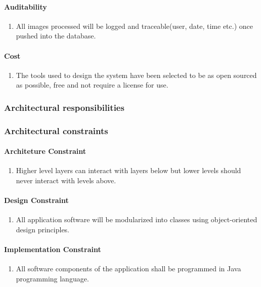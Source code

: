 \documentclass[a4paper,12pt]{report}
\begin{document}
\paragraph{Auditability}
\begin{enumerate}
	\item All images processed will be logged and traceable(user, date, time etc.) once pushed into the database.
\end{enumerate}
\paragraph{Cost}
\begin{enumerate}
	\item The tools used to design the system have been selected to be as open sourced as possible, free and not require a license for use.
\end{enumerate}

\subsubsection{Architectural responsibilities}


\subsubsection{Architectural constraints}
\paragraph{Architeture Constraint}
\begin{enumerate}
	\item Higher level layers can interact with layers below but lower levels should never interact with levels above.
\end{enumerate}
\paragraph{Design Constraint}
\begin{enumerate}
	\item All application software will be modularized into classes using object-oriented design principles.
\end{enumerate}
\paragraph{Implementation Constraint}
\begin{enumerate}
	\item All software components of the application shall be programmed in Java programming language.
\end{enumerate}
\end{document}

